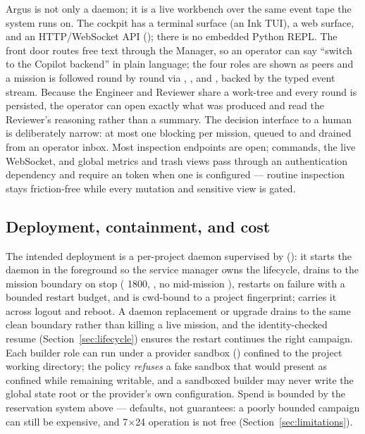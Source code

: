 Argus is not only a daemon; it is a live workbench over the same event tape the system
runs on. The cockpit has a terminal surface (an Ink TUI), a web surface, and an
HTTP/WebSocket API (); there is no embedded Python REPL. The
front door routes free text through the Manager, so an operator can say ``switch to the
Copilot backend'' in plain language; the four roles are shown as peers and a mission is
followed round by round via , , and ,
backed by the typed event stream. Because the Engineer and Reviewer share a work-tree
and every round is persisted, the operator can open exactly what was produced and read
the Reviewer's reasoning rather than a summary. The decision interface to a human is
deliberately narrow: at most one blocking  per mission, queued
to and drained from an operator inbox. Most inspection endpoints are open; commands,
the live WebSocket, and global metrics and trash views pass through an authentication
dependency and require an  token when one is configured --- routine
inspection stays friction-free while every mutation and sensitive view is gated.

\subsection{Deployment, containment, and cost}

The intended deployment is a per-project daemon supervised by 
(): it starts the daemon in the foreground so the
service manager owns the lifecycle, drains to the mission boundary on stop
( 1800, , no mid-mission ), restarts
on failure with a bounded restart budget, and is cwd-bound to a project fingerprint;
 carries it across logout and reboot. A daemon
replacement or upgrade drains to the same clean boundary rather than killing a live
mission, and the identity-checked resume (Section~\ref{sec:lifecycle}) ensures the
restart continues the right campaign. Each builder role can run under a provider
sandbox () confined to the project working directory; the
policy \emph{refuses} a fake sandbox that would present as confined while remaining
writable, and a sandboxed builder may never write the global state root or the
provider's own configuration. Spend is bounded by the reservation system above ---
defaults, not guarantees: a poorly bounded campaign can still be expensive, and
7$\times$24 operation is not free (Section~\ref{sec:limitations}).
